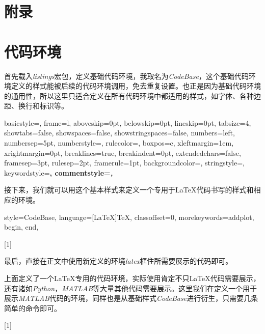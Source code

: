 \section{附录}

\section{代码环境}

首先载入\emph{listings}宏包，定义基础代码环境，我取名为\emph{CodeBase}，这个基础代码环境定义的样式能被后续的代码环境调用，免去重复设置。也正是因为基础代码环境的通用性，所以这里只适合定义在所有代码环境中都适用的样式，如字体、各种边距、换行和标识等。

\begin{latex}{}
{
	basicstyle=\small\ttfamily,
	frame=l,
	aboveskip=0pt,%
	belowskip=0pt,%
	lineskip=0pt,
	tabsize=4,%
	showtabs=false,%
	showspaces=false,%
	showstringspaces=false,
	numbers=left,
	numbersep=5pt,%
	numberstyle=\small\ttfamily,
	rulecolor=\color{cyan},
	boxpos=c,
	xleftmargin=1em,%
	xrightmargin=0pt,
	breaklines=true,%
	breakindent=0pt,%
	extendedchars=false,%
	framesep=3pt,
	rulesep=2pt,
	framerule=1pt,
	backgroundcolor=\color{gray!5},
	stringstyle=\color{green!40!black!100},
	keywordstyle=\bfseries\color[RGB]{0,0,255},
	commentstyle=\slshape\color{black!60},
}
\end{latex}

接下来，我们就可以用这个基本样式来定义一个专用于\LaTeX 代码书写的样式和相应的环境。

\begin{latex}{}
{
	style=CodeBase,
	language=[LaTeX]TeX,
	classoffset=0,
	morekeywords={addplot, begin, end},
}

[1]{\lstset{style=LaTeX}}{}
\end{latex}

最后，直接在正文中使用新定义的环境\emph{latex}框住所需要展示的代码即可。

上面定义了一个\LaTeX 专用的代码环境，实际使用肯定不只\LaTeX 代码需要展示，还有诸如\emph{Python}，\emph{MATLAB}等大量其他代码需要展示。这里我们在定义一个用于展示\emph{MATLAB}代码的环境，同样也是从基础样式\emph{CodeBase}进行衍生，只需要几条简单的命令即可。

\begin{latex}{}

[1]{\lstset{style=Matlab}}{}
\end{latex}


